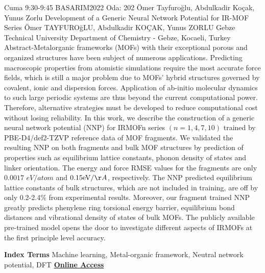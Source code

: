 
    \begin{abstract_basarim}
    {Cuma 9:30-9:45}
    {BASARIM2022}
    {Oda: 202}
    {Ömer Tayfuroğlu, Abdulkadir Koçak, Yunus Zorlu}
    {Development of a Generic Neural Network Potential for IR-MOF Series}
    {%
    Ömer TAYFUROğLU, Abdulkadir KOÇAK, Yunus ZORLU}
    {%
    }
    {%
    Gebze Technical University Department of Chemistry - Gebze, Kocaeli, Turkey}
    Abstract-Metalorganic frameworks (MOFs) with their exceptional porous and organized structures have been subject of numerous applications. Predicting macroscopic properties from atomistic simulations require the most accurate force fields, which is still a major problem due to MOFs' hybrid structures governed by covalent, ionic and dispersion forces. Application of ab-initio molecular dynamics to such large periodic systems are thus beyond the current computational power. Therefore, alternative strategies must be developed to reduce computational cost without losing reliability. In this work, we describe the construction of a generic neural network potential (NNP) for IRMOFn series $(n=1,4,7,10)$ trained by PBE-D4/def2-TZVP reference data of MOF fragments. We validated the resulting NNP on both fragments and bulk MOF structures by prediction of properties such as equilibrium lattice constants, phonon density of states and linker orientation. The energy and force RMSE values for the fragments are only $0.0017$ $e V / a t o m$ and $0.15 \mathrm{eV} / \AA$, respectively. The NNP predicted equilibrium lattice constants of bulk structures, which are not included in training, are off by only 0.2-2.4\% from experimental results. Moreover, our fragment trained NNP greatly predicts phenylene ring torsional energy barrier, equilibrium bond distances and vibrational density of states of bulk MOFs. The publicly available pre-trained model opens the door to investigate different aspects of IRMOFs at the first principle level accuracy. 
    
            \textbf{Index Terms} \newline{}Machine learning, Metal-organic framework, Neutral network potential, DFT
     \newline\newline\noindent \href{https://drive.google.com/file/d/1ShkZArQaz_SdUVB_RducxVQ4g6aOiss5/view?usp=drivesdk}{\bfseries Online Access}
    \end{abstract_basarim}
    